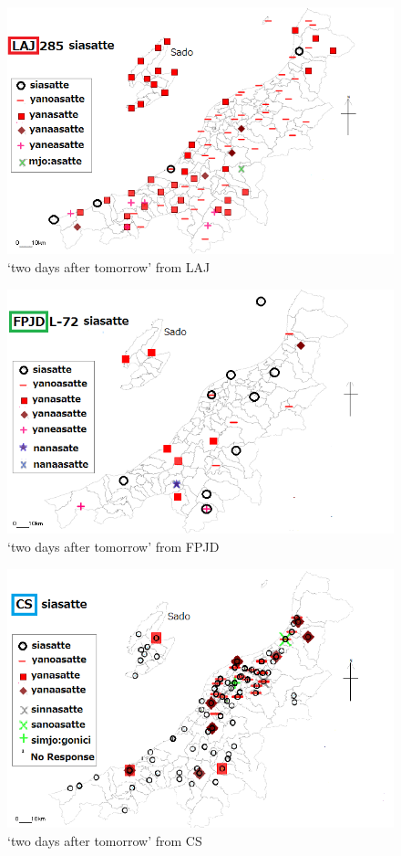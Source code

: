 \documentclass[output=paper]{LSP/langsci}
\begin{document}
\begin{figure}
\includegraphics[width=.75\textwidth]{illustrations/fuku2_fig5a}
\caption{`two days after tomorrow' from LAJ}
\label{fig:5a}
\end{figure}

\begin{figure}
\includegraphics[width=.75\textwidth]{illustrations/fuku2_fig5b}
\caption{`two days after tomorrow' from FPJD}
\label{fig:5b}
\end{figure}

\begin{figure}
\includegraphics[width=.75\textwidth]{illustrations/fuku2_fig5c}
\caption{`two days after tomorrow' from CS}
\label{fig:5c}
\end{figure}
\end{document}
